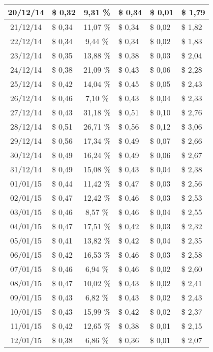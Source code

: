 \begin{center}
\begin{small}
\begin{longtable}{|c|l|c|l|l|l|}
20/12/14 & \$ 0,32 & 9,31 \% & \$ 0,34 & \$ 0,01 & \$ 1,79 \\ \hline
21/12/14 & \$ 0,34 & 11,07 \% & \$ 0,34 & \$ 0,02 & \$ 1,82 \\ \hline
22/12/14 & \$ 0,34 & 9,44 \% & \$ 0,34 & \$ 0,02 & \$ 1,83 \\ \hline
23/12/14 & \$ 0,35 & 13,88 \% & \$ 0,38 & \$ 0,03 & \$ 2,04 \\ \hline
24/12/14 & \$ 0,38 & 21,09 \% & \$ 0,43 & \$ 0,06 & \$ 2,28 \\ \hline
25/12/14 & \$ 0,42 & 14,04 \% & \$ 0,45 & \$ 0,05 & \$ 2,43 \\ \hline
26/12/14 & \$ 0,46 & 7,10 \% & \$ 0,43 & \$ 0,04 & \$ 2,33 \\ \hline
27/12/14 & \$ 0,43 & 31,18 \% & \$ 0,51 & \$ 0,10 & \$ 2,76 \\ \hline
28/12/14 & \$ 0,51 & 26,71 \% & \$ 0,56 & \$ 0,12 & \$ 3,06 \\ \hline
29/12/14 & \$ 0,56 & 17,34 \% & \$ 0,49 & \$ 0,07 & \$ 2,66 \\ \hline
30/12/14 & \$ 0,49 & 16,24 \% & \$ 0,49 & \$ 0,06 & \$ 2,67 \\ \hline
31/12/14 & \$ 0,49 & 15,08 \% & \$ 0,43 & \$ 0,04 & \$ 2,38 \\ \hline
01/01/15 & \$ 0,44 & 11,42 \% & \$ 0,47 & \$ 0,03 & \$ 2,56 \\ \hline
02/01/15 & \$ 0,47 & 12,42 \% & \$ 0,46 & \$ 0,03 & \$ 2,53 \\ \hline
03/01/15 & \$ 0,46 & 8,57 \% & \$ 0,46 & \$ 0,04 & \$ 2,55 \\ \hline
04/01/15 & \$ 0,47 & 17,51 \% & \$ 0,42 & \$ 0,03 & \$ 2,32 \\ \hline
05/01/15 & \$ 0,41 & 13,82 \% & \$ 0,42 & \$ 0,04 & \$ 2,35 \\ \hline
06/01/15 & \$ 0,42 & 16,53 \% & \$ 0,46 & \$ 0,03 & \$ 2,58 \\ \hline
07/01/15 & \$ 0,46 & 6,94 \% & \$ 0,46 & \$ 0,02 & \$ 2,60 \\ \hline
08/01/15 & \$ 0,47 & 10,02 \% & \$ 0,43 & \$ 0,02 & \$ 2,41 \\ \hline
09/01/15 & \$ 0,43 & 6,82 \% & \$ 0,43 & \$ 0,02 & \$ 2,43 \\ \hline
10/01/15 & \$ 0,43 & 15,99 \% & \$ 0,42 & \$ 0,02 & \$ 2,37 \\ \hline
11/01/15 & \$ 0,42 & 12,65 \% & \$ 0,38 & \$ 0,01 & \$ 2,15 \\ \hline
12/01/15 & \$ 0,38 & 6,86 \% & \$ 0,36 & \$ 0,01 & \$ 2,07 \\ \hline

\end{longtable}
\end{small}
\end{center}

